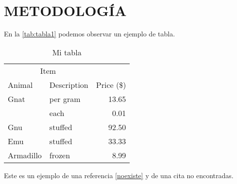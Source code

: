 \chapter{METODOLOGÍA}

\lipsum[1-1] \parencite{latex2e}

En la \vref{tab:tabla1} podemos observar un ejemplo de tabla.

\begin{table}[H]
	\centering
	\caption{Mi tabla}\label{tab:tabla1}
	\begin{tabular}{@{}llr@{}}
		\toprule
		\multicolumn{2}{c}{Item} &                          \\ \cmidrule(r){1-2}
		Animal                   & Description & Price (\$) \\ \midrule
		Gnat                     & per gram    & 13.65      \\
		                         & each        & 0.01       \\
		Gnu                      & stuffed     & 92.50      \\
		Emu                      & stuffed     & 33.33      \\
		Armadillo                & frozen      & 8.99       \\ \bottomrule
	\end{tabular}
\end{table}

Este es un ejemplo de una referencia \cref{noexiste} y de una cita\autocite{noexiste} no encontradas.